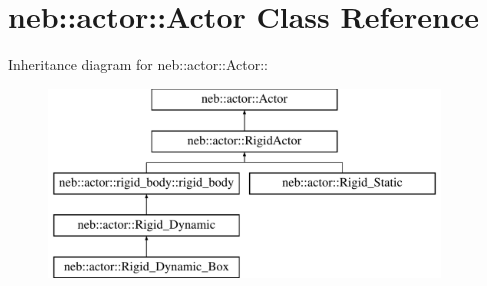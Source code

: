 \hypertarget{classneb_1_1actor_1_1Actor}{
\section{neb::actor::Actor Class Reference}
\label{classneb_1_1actor_1_1Actor}
}
Inheritance diagram for neb::actor::Actor::\begin{figure}[H]
\begin{center}
\leavevmode
\includegraphics[height=5cm]{classneb_1_1actor_1_1Actor}
\end{center}
\end{figure}

